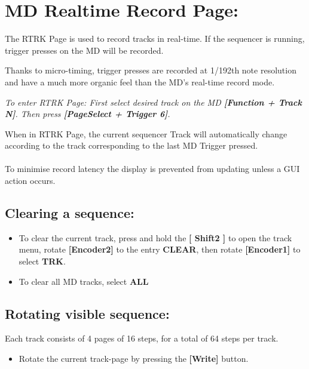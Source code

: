 \chapter{MD Realtime Record Page:}

The RTRK Page is used to record tracks in real-time. If the sequencer is running, trigger presses on the MD will be recorded.

Thanks to micro-timing, trigger presses are recorded at 1/192th note resolution and have a much more organic feel than the MD’s real-time record mode.

\textit{To enter RTRK Page: First select desired track on the MD \textbf{[Function + Track N]}. Then press \textbf{[PageSelect + Trigger 6]}.}


When in RTRK Page, the current sequencer Track will automatically change according to the track corresponding to the last MD Trigger pressed.\\
\\To minimise record latency the display is prevented from updating unless a GUI action occurs. 


\section{Clearing a sequence:}
\begin{itemize}
\item To clear the current track, press and hold the\textbf{ [ Shift2 ]} to open the track menu, rotate \textbf{[Encoder2]} to the entry \textbf{CLEAR}, then rotate \textbf{[Encoder1]} to select \textbf{TRK}.
\item To clear all MD tracks, select \textbf{ALL}
\end{itemize}

\vspace{-0.3cm}

\section{Rotating visible sequence:}
Each track consists of 4 pages of 16 steps, for a total of 64 steps per track.
\begin{itemize}
\item Rotate the current track-page by pressing the \textbf{[Write] }button.
\end{itemize}

